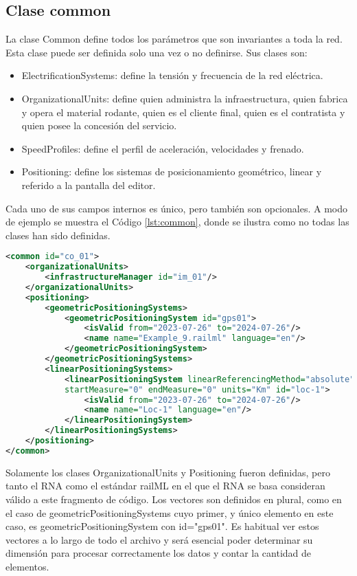 \subsection{Clase common}
    \label{sec:common}

    La clase Common define todos los parámetros que son invariantes a toda la red. Esta clase puede ser definida solo una vez o no definirse. Sus clases son:

    \begin{itemize}
        \item ElectrificationSystems: define la tensión y frecuencia de la red eléctrica.
        \item OrganizationalUnits: define quien administra la infraestructura, quien fabrica y opera el material rodante, quien es el cliente final, quien es el contratista y quien posee la concesión del servicio. 
        \item SpeedProfiles: define el perfil de aceleración, velocidades y frenado.
        \item Positioning: define los sistemas de posicionamiento geométrico, linear y referido a la pantalla del editor.
    \end{itemize}

    Cada uno de sus campos internos es único, pero también son opcionales. A modo de ejemplo se muestra el Código \ref{lst:common}, donde se ilustra como no todas las clases han sido definidas.
    
    \begin{lstlisting}[language = XML, caption = Clase Common , label = {lst:common}]
<common id="co_01">
    <organizationalUnits>
        <infrastructureManager id="im_01"/>
    </organizationalUnits>
    <positioning>
        <geometricPositioningSystems>
            <geometricPositioningSystem id="gps01">
                <isValid from="2023-07-26" to="2024-07-26"/>
                <name name="Example_9.railml" language="en"/>
            </geometricPositioningSystem>
        </geometricPositioningSystems>
        <linearPositioningSystems>
            <linearPositioningSystem linearReferencingMethod="absolute" 
            startMeasure="0" endMeasure="0" units="Km" id="loc-1">
                <isValid from="2023-07-26" to="2024-07-26"/>
                <name name="Loc-1" language="en"/>
            </linearPositioningSystem>
        </linearPositioningSystems>
    </positioning>
</common>
    \end{lstlisting}

    Solamente los clases OrganizationalUnits y Positioning fueron definidas, pero tanto el RNA como el estándar railML en el que el RNA se basa consideran válido a este fragmento de código. Los vectores son definidos en plural, como en el caso de geometricPositioningSystems cuyo primer, y único elemento en este caso, es geometricPositioningSystem con id="gps01". Es habitual ver estos vectores a lo largo de todo el archivo y será esencial poder determinar su dimensión para procesar correctamente los datos y contar la cantidad de elementos.